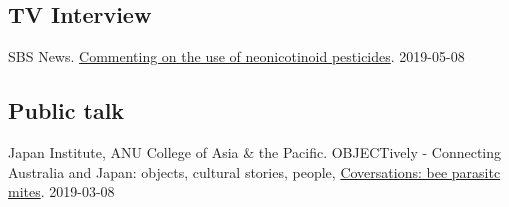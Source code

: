 \documentclass[11pt]{article}
\begin{document}
\subsection{TV Interview}
\ind SBS News.  \href{https://www.sbs.com.au/news/australian-beekeepers-call-for-ban-on-potentially-harmful-pesticide}{Commenting on the use of neonicotinoid pesticides}. 2019-05-08

\subsection{Public talk}
\ind Japan Institute, ANU College of Asia \& the Pacific. OBJECTively - Connecting Australia and Japan: objects, cultural stories,
people, \href{http://japaninstitute.anu.edu.au/events/objectively-connecting-australia-and-japan-objects-cultural-stories-people}{Coversations: bee parasitc mites}. 2019-03-08
\end{document}
